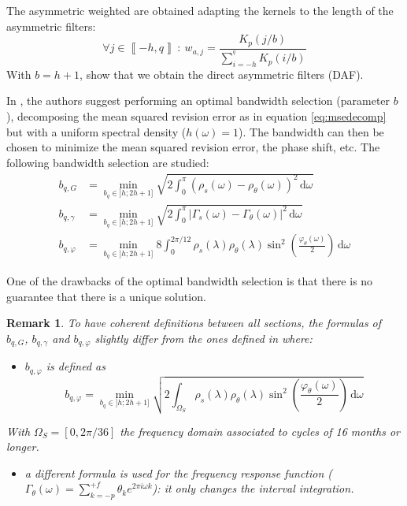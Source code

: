\documentclass[
  12pt,
  ,
  a4paper]{article}
\providecommand{\tightlist}{%
  \setlength{\itemsep}{0pt}\setlength{\parskip}{0pt}}
\newcommand\1{\mathds{1}}
\newcommand\ud{\,\mathrm{d}}
\newtheorem*{remark}{Remark}
\begin{document}
The asymmetric weighted are obtained adapting the kernels to the length of the asymmetric filters:
\[
\forall j\in\left\llbracket -h,q\right\rrbracket\::\: w_{a,j}=\frac{K_p(j/b)}{\sum_{i=-h}^{^q}K_p(i/b)}
\]
With \(b=h+1\), \textcite{proietti2008} show that we obtain the direct asymmetric filters (DAF).

In \textcite{dagumbianconcini2015}, the authors suggest performing an optimal bandwidth selection (parameter \(b\)), decomposing the mean squared revision error as in equation \eqref{eq:msedecomp} but with a uniform spectral density (\(h(\omega)=1\)).
The bandwidth can then be chosen to minimize the mean squared revision error, the phase shift, etc.
The following bandwidth selection are studied:
\begin{align*}
b_{q,G}&=\underset{b_q\in]h;2 h+1]}{\min}
\sqrt{2\int_{0}^{\pi}
\left(\rho_s(\omega)-\rho_\theta(\omega)\right)^{2}\ud \omega
}\\
b_{q,\gamma}&=\underset{b_q\in]h;2 h+1]}{\min}
\sqrt{2\int_{0}^{\pi}
\lvert \Gamma_s(\omega)-\Gamma_\theta(\omega)\rvert^2\ud \omega
} \\
b_{q,\varphi}&=\underset{b_q\in]h;2 h+1]}{\min}
8\int_{0}^{2\pi/12}
\rho_s(\lambda)\rho_\theta(\lambda)\sin^{2}\left(\frac{\varphi_\theta(\omega)}{2}\right)\ud \omega
\end{align*}

One of the drawbacks of the optimal bandwidth selection is that there is no guarantee that there is a unique solution.

\begin{remark}

To have coherent definitions between all sections, the formulas of \(b_{q,G}\), \(b_{q,\gamma}\) and \(b_{q,\varphi}\) slightly differ from the ones defined in \textcite{dagumbianconcini2015} where:

\begin{itemize}
\tightlist
\item
  \(b_{q,\varphi}\) is defined as
  \[
  b_{q,\varphi}=\underset{b_q\in]h;2 h+1]}{\min}
  \sqrt{2\int_{\Omega_S}
  \rho_s(\lambda)\rho_\theta(\lambda)\sin^{2}\left(\frac{\varphi_\theta(\omega)}{2}\right)\ud \omega}
  \]
\end{itemize}

With \(\Omega_S=[0,2\pi/36]\) the frequency domain associated to cycles of 16 months or longer.

\begin{itemize}
\tightlist
\item
  a different formula is used for the frequency response function (\(\Gamma_\theta(\omega)=\sum_{k=-p}^{+f} \theta_k e^{2\pi i \omega k}\)): it only changes the interval integration.
\end{itemize}

\end{remark}
\end{document}
